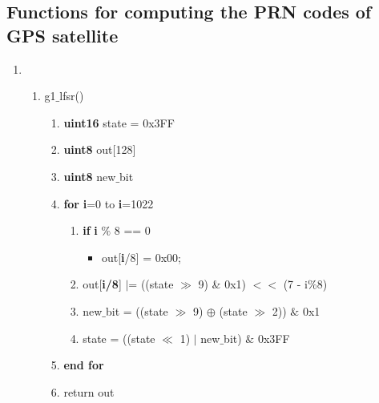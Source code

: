 \documentclass[journal,10pt,onecolumn]{article}
\begin{document}
\subsection*{Functions for computing the PRN codes of GPS satellite}
\begin{enumerate}
    \item[]
    \begin{enumerate}
    \item g1$\_$lfsr()
    \begin{enumerate}
    \item[] \textbf{uint16} state = 0x3FF
    \item[] \textbf{uint8} out[128]
    \item[] \textbf{uint8} new$\_$bit
    \item[] \textbf{for} \textbf{i}=0 to \textbf{i}=1022
        \begin{enumerate}
            \item[] \textbf{if} \textbf{i} $\%$ 8 == 0
            \begin{itemize}
                \item[] out[\textbf{i}/8] = 0x00; 
            \end{itemize}
            \item[] out[\textbf{i/8}] $|$= ((state $\gg$ 9) \& 0x1) $<<$ (7 - i$\%$8) 
            \item[] new$\_$bit = ((state $\gg$ 9) $\oplus$ (state $\gg$ 2)) $\&$ 0x1
            \item[] state = ((state $\ll$ 1) $\vert$  new$\_$bit) $\&$ 0x3FF
        \end{enumerate}
    \item[] \textbf{end for}
    \item[] return out
    \end{enumerate}
    
    


\end{enumerate}
\end{enumerate}
\end{document}
